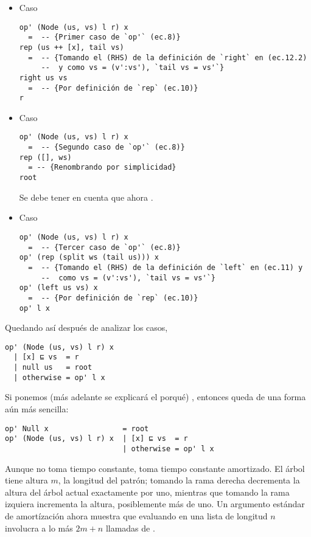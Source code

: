 \begin{itemize}
\item Caso 
\begin{verbatim}
op' (Node (us, vs) l r) x
  =  -- {Primer caso de `op'` (ec.8)}
rep (us ++ [x], tail vs)
  =  -- {Tomando el (RHS) de la definición de `right` en (ec.12.2) 
     --  y como vs = (v':vs'), `tail vs = vs'`}
right us vs
  =  -- {Por definición de `rep` (ec.10)}
r
\end{verbatim}

\item Caso 
\begin{verbatim}
op' (Node (us, vs) l r) x
  =  -- {Segundo caso de `op'` (ec.8)}
rep ([], ws)
  = -- {Renombrando por simplicidad}
root
\end{verbatim}
Se debe tener en cuenta que ahora .

\item Caso 
\begin{verbatim}
op' (Node (us, vs) l r) x
  =  -- {Tercer caso de `op'` (ec.8)}
op' (rep (split ws (tail us))) x
  =  -- {Tomando el (RHS) de la definición de `left` en (ec.11) y 
     --  como vs = (v':vs'), `tail vs = vs'`}
op' (left us vs) x
  =  -- {Por definición de `rep` (ec.10)}
op' l x
\end{verbatim}
\end{itemize}

Quedando así después de analizar los casos,
\begin{verbatim}
op' (Node (us, vs) l r) x
  | [x] ⊑ vs  = r
  | null us   = root
  | otherwise = op' l x
\end{verbatim}

Si ponemos  (más adelante se explicará el porqué) %
, entonces  queda de una forma aún más sencilla:
\begin{verbatim}
op' Null x                 = root
op' (Node (us, vs) l r) x  | [x] ⊑ vs  = r
                           | otherwise = op' l x
\end{verbatim}

Aunque  no toma tiempo constante, toma tiempo constante amortizado. %
El árbol  tiene altura $m$, la longitud del patrón; tomando la rama derecha decrementa la altura del árbol actual exactamente por uno, %
mientras que tomando la rama izquiera incrementa la altura, posiblemente más de uno. %
Un argumento estándar de amortízación ahora muestra que evaluando  en una lista de longitud $n$ involucra a lo más $2m + n$ llamadas de . %

